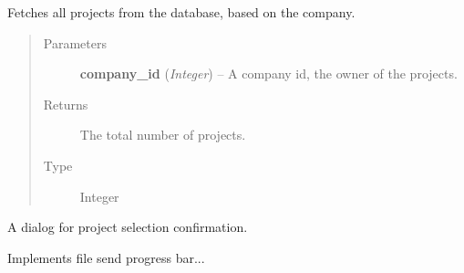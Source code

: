 \documentclass[letterpaper,10pt,english]{sphinxmanual}
\begin{document}
\begin{fulllineitems}

\begin{fulllineitems}
\label{dialogs:dialogs.ProjectSelectDialog.UpdateProjects}
Fetches all projects from the database, based on the company.
\begin{quote}\begin{description}
\item[{Parameters}] \leavevmode
\textbf{company\_id} (\emph{Integer}) -- A company id, the owner of the projects.

\item[{Returns}] \leavevmode
The total number of projects.

\item[{Type }] \leavevmode
Integer

\end{description}\end{quote}

\end{fulllineitems}


\end{fulllineitems}


\begin{fulllineitems}
\label{dialogs:dialogs.ProjectSelectedDialog}
A dialog for project selection confirmation.

\end{fulllineitems}


\begin{fulllineitems}
\label{dialogs:dialogs.SendProgressBar}
Implements file send progress bar...

\end{fulllineitems}

\end{document}
